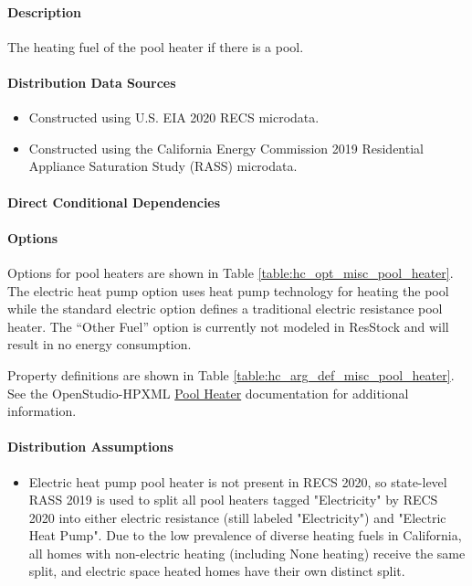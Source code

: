\paragraph{Description}
% 
The heating fuel of the pool heater if there is a pool.

\paragraph{Distribution Data Sources}
% 
\begin{itemize}
    \item Constructed using U.S. EIA 2020 RECS microdata.
    \item Constructed using the California Energy Commission 2019 Residential Appliance Saturation Study (RASS) microdata.
\end{itemize} 

\paragraph{Direct Conditional Dependencies}


\paragraph{Options}
Options for pool heaters are shown in Table \ref{table:hc_opt_misc_pool_heater}. The electric heat pump option uses heat pump technology for heating the pool while the standard electric option defines a traditional electric resistance pool heater. The “Other Fuel” option is currently not modeled in ResStock and will result in no energy consumption.



Property definitions are shown in Table \ref{table:hc_arg_def_misc_pool_heater}. See the OpenStudio-HPXML \href{https://openstudio-hpxml.readthedocs.io/en/v1.10.0/workflow_inputs.html#pool-heater}{Pool Heater} documentation for additional information.



\paragraph{Distribution Assumptions}
% 
\begin{itemize}
    \item Electric heat pump pool heater is not present in RECS 2020, so state-level RASS 2019 is used to split all pool heaters tagged "Electricity" by RECS 2020 into either electric resistance (still labeled "Electricity") and "Electric Heat Pump". Due to the low prevalence of diverse heating fuels in California, all homes with non-electric heating (including None heating) receive the same split, and electric space heated homes have their own distinct split.
\end{itemize}
